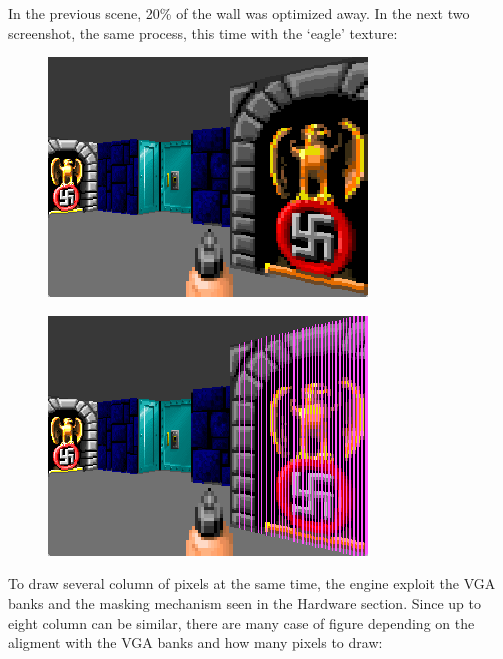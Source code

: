 In the previous scene, 20\% of the wall was optimized away. In the next two screenshot, the same process, this time with the `eagle' texture:
\begin{figure}[H]
 \centering
 \includegraphics[width=\textwidth]{imgs/post_optimization_2_show.png}
\end{figure}


\begin{figure}[H]
 \centering
 \includegraphics[width=\textwidth]{imgs/post_optimization_2_pink_show.png}
\end{figure}
 
To draw several column of pixels at the same time, the engine exploit the VGA banks and the masking mechanism seen in the Hardware section.
Since up to eight column can be similar, there are many case of figure depending on the aligment with the VGA banks and how many pixels to draw:

